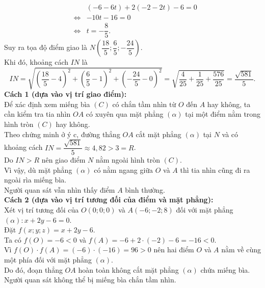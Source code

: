 \begin{ex}
{\begin{itemchoice}
\begin{eqnarray*}
				&& (-6-6t) + 2(-2-2t) - 6 = 0\\
				&\Leftrightarrow& -10t - 16 = 0\\ 
				&\Leftrightarrow& t = -\dfrac{8}{5}.
			\end{eqnarray*}
			Suy ra tọa độ điểm giao là $N\left(\dfrac{18}{5};\dfrac{6}{5};-\dfrac{24}{5}\right)$.\\
			Khi đó, khoảng cách $IN$ là
			\[IN=\sqrt{\left(\dfrac{18}{5}-4\right)^2+\left(\dfrac{6}{5}-1\right)^2+\left(-\dfrac{24}{5}-0\right)^2}=\sqrt{\dfrac{4}{25}+\dfrac{1}{25}+\dfrac{576}{25}}=\dfrac{\sqrt{581}}{5}.\]
			\itemch \textbf{Cách 1 (dựa vào vị trí giao điểm):}\\
			Để xác định xem miếng bìa $(C)$ có chắn tầm nhìn từ $O$ đến $A$ hay không, ta cần kiểm tra tia nhìn $OA$ có xuyên qua mặt phẳng $(\alpha)$ tại một điểm nằm trong hình tròn $(C)$ hay không.\\
			Theo chứng minh ở ý c, đường thẳng $OA$ cắt mặt phẳng $(\alpha)$ tại $N$ và có khoảng cách $IN = \dfrac{\sqrt{581}}{5} \approx 4{,}82 > 3 = R$.\\
			Do $IN > R$ nên giao điểm $N$ nằm ngoài hình tròn $(C)$.\\
			Vì vậy, dù mặt phẳng $(\alpha)$ có nằm ngang giữa $O$ và $A$ thì tia nhìn cũng đi ra ngoài rìa miếng bìa.\\ Người quan sát vẫn nhìn thấy điểm $A$ bình thường.\\
			\textbf{Cách 2 (dựa vào vị trí tương đối của điểm và mặt phẳng):}\\
			Xét vị trí tương đối của $O(0;0;0)$ và $A(-6;-2;8)$ đối với mặt phẳng $(\alpha)\colon x+2y-6=0$. \\
			Đặt $f(x;y;z)=x+2y-6$.\\
			Ta có $f(O)=-6<0$ và $f(A)=-6+2\cdot(-2)-6=-16<0$.\\
			Vì $f(O)\cdot f(A)=(-6)\cdot(-16)=96>0$ nên hai điểm $O$ và $A$ nằm về cùng một phía đối với mặt phẳng $(\alpha)$.\\
			Do đó, đoạn thẳng $OA$ hoàn toàn không cắt mặt phẳng $(\alpha)$ chứa miếng bìa.\\ Người quan sát không thể bị miếng bìa chắn tầm nhìn.
		\end{itemchoice}
	}
\end{ex}

